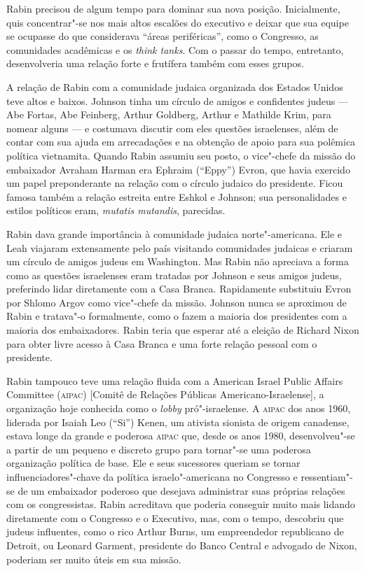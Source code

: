 Rabin precisou de algum tempo para dominar sua nova posição.
Inicialmente, quis concentrar"-se nos mais altos escalões do executivo e
deixar que sua equipe se ocupasse do que considerava ``áreas
periféricas'', como o Congresso, as comunidades acadêmicas e os
\textit{think tanks}. Com o passar do tempo, entretanto, desenvolveria uma
relação forte e frutífera também com esses grupos.

A relação de Rabin com a comunidade judaica organizada dos Estados Unidos teve
altos e baixos. Johnson tinha um círculo de amigos e confidentes judeus
--- Abe Fortas, Abe Feinberg, Arthur Goldberg, Arthur e Mathilde Krim,
para nomear alguns --- e costumava discutir com eles questões israelenses,
além de contar com sua ajuda em arrecadações e na obtenção de apoio
para sua polêmica política vietnamita. Quando Rabin assumiu seu posto, o
vice"-chefe da missão do embaixador Avraham Harman era Ephraim (``Eppy'')
Evron, que havia exercido um papel preponderante na relação com o círculo
judaico do presidente. Ficou famosa também a relação estreita entre
Eshkol e Johnson; sua personalidades e estilos políticos eram,
\textit{mutatis mutandis}, parecidas.

Rabin dava grande importância à comunidade judaica norte"-americana. Ele
e Leah viajaram extensamente pelo país visitando comunidades judaicas e
criaram um círculo de amigos judeus em Washington. Mas Rabin não
apreciava a forma como as questões israelenses eram tratadas por Johnson
e seus amigos judeus, preferindo lidar diretamente com a Casa Branca.
Rapidamente substituiu Evron por Shlomo Argov como vice"-chefe da missão.
Johnson nunca se aproximou de Rabin e tratava"-o formalmente, como o
fazem a maioria dos presidentes com a maioria dos embaixadores. Rabin
teria que esperar até a eleição de Richard Nixon para obter livre acesso
à Casa Branca e uma forte relação pessoal com o presidente.

Rabin tampouco teve uma relação fluida com a American Israel Public
Affairs Committee (\textsc{aipac}) {[}Comitê de Relações Públicas Americano-Israelense{]}, a organização hoje conhecida como o \textit{lobby}
pró"-israelense. A \textsc{aipac} dos anos 1960, liderada por Isaiah Leo (``Si'')
Kenen, um ativista sionista de origem canadense, estava longe da grande
e poderosa \textsc{aipac} que, desde os anos 1980, desenvolveu"-se a partir de um
pequeno e discreto grupo para tornar"-se uma poderosa organização
política de base. Ele e seus sucessores queriam se tornar
influenciadores"-chave da política israelo"-americana no Congresso e
ressentiam"-se de um embaixador poderoso que desejava administrar suas
próprias relações com os congressistas. Rabin acreditava que poderia
conseguir muito mais lidando diretamente com o Congresso e o Executivo,
mas, com o tempo, descobriu que judeus influentes, como o rico Arthur Burns,
um empreendedor republicano de Detroit, ou Leonard Garment, presidente do Banco
Central e advogado de Nixon, poderiam ser muito úteis
em sua missão.

